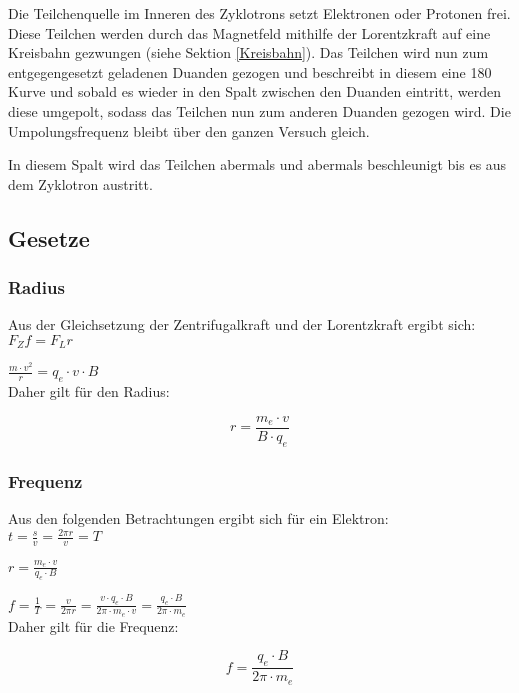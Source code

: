 
Die Teilchenquelle im Inneren des Zyklotrons setzt Elektronen oder Protonen frei. Diese Teilchen werden durch das Magnetfeld mithilfe der Lorentzkraft auf eine Kreisbahn gezwungen (siehe Sektion \ref{Kreisbahn}). Das Teilchen wird nun zum entgegengesetzt geladenen Duanden gezogen und beschreibt in diesem eine 180%
Kurve und sobald es wieder in den Spalt zwischen den Duanden eintritt, werden diese umgepolt, sodass das Teilchen nun zum anderen Duanden gezogen wird. Die Umpolungsfrequenz bleibt über den ganzen Versuch gleich. 

In diesem Spalt wird das Teilchen abermals und abermals beschleunigt bis es aus dem Zyklotron austritt.

\subsection{Gesetze}

\subsubsection{Radius}

Aus der Gleichsetzung der Zentrifugalkraft und der Lorentzkraft ergibt sich: \\

$
F_Zf = F_Lr
$ 

$
\frac{m \cdot v^2}{r} = q_e \cdot v \cdot B
$ \\

\hspace{-7mm} Daher gilt für den Radius:

\begin{equation}
	r = \frac{m_e \cdot v}{B \cdot q_e}
\end{equation}


\subsubsection{Frequenz}

Aus den folgenden Betrachtungen ergibt sich für ein Elektron: \\

$
t = \frac{s}{v} = \frac{2 \pi r}{v} = T
$

$
r = \frac{m_e \cdot v}{q_e \cdot B}
$

$
f = \frac{1}{T} = \frac{v}{2 \pi r}
= \frac{v \cdot q_e \cdot B}{2 \pi \cdot m_e \cdot v} 
= \frac{q_e \cdot B}{2 \pi \cdot m_e}
$ \\

\hspace{-7mm}Daher gilt für die Frequenz:

\begin{equation}
	f = \frac{q_e \cdot B}{2 \pi \cdot m_e}
\end{equation}